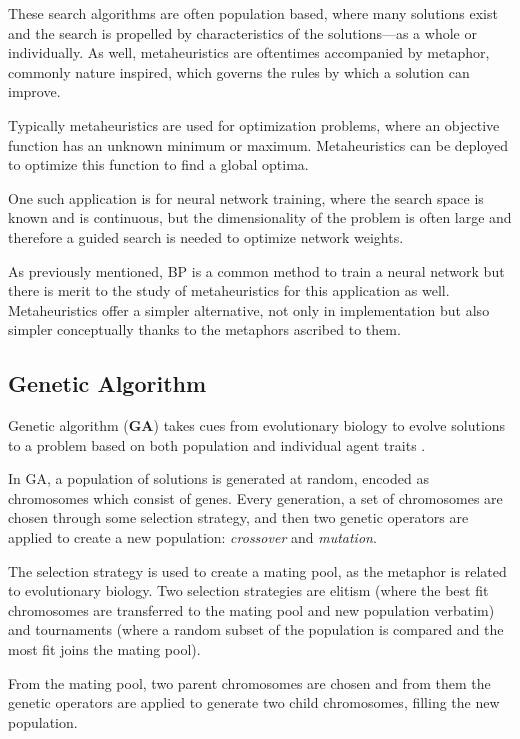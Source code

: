 \documentclass[a4paper,12pt]{article}
\begin{document}
These search algorithms are often population based, where many solutions exist and the search is propelled by characteristics of the solutions---as a whole or individually. As well, metaheuristics are oftentimes accompanied by metaphor, commonly nature inspired, which governs the rules by which a solution can improve.

\pagebreak

Typically metaheuristics are used for optimization problems, where an objective function has an unknown minimum or maximum. Metaheuristics can be deployed to optimize this function to find a global optima.

One such application is for neural network training, where the search space is known and is continuous, but the dimensionality of the problem is often large and therefore a guided search is needed to optimize network weights.

As previously mentioned, BP is a common method to train a neural network but there is merit to the study of metaheuristics for this application as well. Metaheuristics offer a simpler alternative, not only in implementation but also simpler conceptually thanks to the metaphors ascribed to them.

\subsection{Genetic Algorithm}

Genetic algorithm (\textbf{GA}) takes cues from evolutionary biology to evolve solutions to a problem based on both population and individual agent traits \cite{ga}.

In GA, a population of solutions is generated at random, encoded as chromosomes which consist of genes. Every generation, a set of chromosomes are chosen through some selection strategy, and then two genetic operators are applied to create a new population: \textit{crossover} and \textit{mutation}.

The selection strategy is used to create a mating pool, as the metaphor is related to evolutionary biology. Two selection strategies are elitism (where the best fit chromosomes are transferred to the mating pool and new population verbatim) and tournaments (where a random subset of the population is compared and the most fit joins the mating pool). 

From the mating pool, two parent chromosomes are chosen and from them the genetic operators are applied to generate two child chromosomes, filling the new population.
\end{document}
